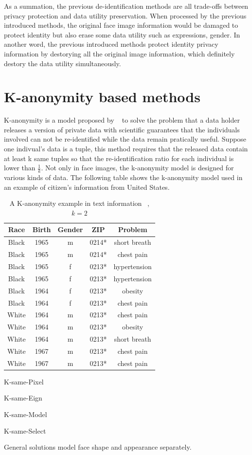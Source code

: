 	\par
	As a summation, the previous de-identification methods are all trade-offs between privacy protection and data utility preservation. When processed by the previous introduced methods, the original face image information would be damaged to protect identity but also erase some data utility such as expressions, gender. In another word, the previous introduced methods protect identity privacy information by destorying all the original image information, which definitely destory the data utility simultaneously. 

\section{K-anonymity based methods}
	K-anonymity is a model proposed by ~\cite{Sweeney02} to solve the problem that a data holder releases a version of private data with scientific guarantees that the individuals involved can not be re-identified while the data remain pratically useful. Suppose one indivual's data is a tuple, this method requires that the released data contain at least k same tuples so that the re-identification ratio for each individual is lower than $\frac{1}{k}$. Not only in face images, the k-anonymity model is designed for various kinds of data. The following table shows the k-anonymity model used in an example of citizen's information from United States. 
		\begin{table}[!htb]
		\centering
			\begin{tabular}{|c|c|c|c|c|}
				\hline
				\textbf{Race} & \textbf{Birth} & \textbf{Gender} & \textbf{ZIP} & \textbf{Problem} \\
				\hline
				Black & 1965 & m & 0214* & short breath \\
				\hline
				Black & 1965 & m & 0214* & chest pain \\
				\hline
				Black & 1965 & f & 0213* & hypertension \\
				\hline
				Black & 1965 & f & 0213* & hypertension \\
				\hline
				Black & 1964 & f & 0213* & obesity \\
				\hline
				Black & 1964 & f & 0213* & chest pain \\
				\hline
				White & 1964 & m & 0213* & chest pain \\
				\hline
				White & 1964 & m & 0213* & obesity \\
				\hline
				White & 1964 & m & 0213* & short breath \\
				\hline
				White & 1967 & m & 0213* & chest pain \\
				\hline
				White & 1967 & m & 0213* & chest pain \\
				\hline
			\end{tabular}
			\caption{A K-anonymity example in text information ~\cite{Sweeney02}, $k = 2$ } 
		\end{table}	

	\par
	K-same-Pixel

	\par
	K-same-Eign

	\par
	K-same-Model

	\par
	K-same-Select
	
	General solutions model face shape and appearance separately. 